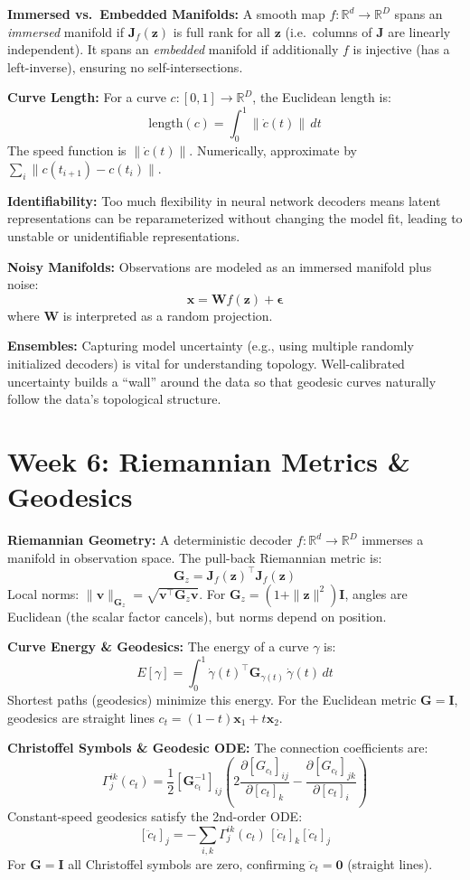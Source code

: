 \documentclass[12pt]{article}
\begin{document}
\textbf{Immersed vs.\ Embedded Manifolds:} A smooth map $f: \mathbb{R}^d \to \mathbb{R}^D$ spans an \emph{immersed} manifold if $\bm{J}_f(\bm{z})$ is full rank for all $\bm{z}$ (i.e.\ columns of $\bm{J}$ are linearly independent). It spans an \emph{embedded} manifold if additionally $f$ is injective (has a left-inverse), ensuring no self-intersections.

\textbf{Curve Length:} For a curve $c: [0,1] \to \mathbb{R}^D$, the Euclidean length is:
\[
\text{length}(c) = \int_0^1 \|\dot{c}(t)\|\, dt
\]
The speed function is $\|\dot{c}(t)\|$. Numerically, approximate by $\sum_{i} \|c(t_{i+1}) - c(t_i)\|$.

\textbf{Identifiability:} Too much flexibility in neural network decoders means latent representations can be reparameterized without changing the model fit, leading to unstable or unidentifiable representations.

\textbf{Noisy Manifolds:} Observations are modeled as an immersed manifold plus noise:
\[
\bm{x} = \bm{W}f(\bm{z}) + \bm{\epsilon}
\]
where $\bm{W}$ is interpreted as a random projection.

\textbf{Ensembles:} Capturing model uncertainty (e.g., using multiple randomly initialized decoders) is vital for understanding topology. Well-calibrated uncertainty builds a ``wall'' around the data so that geodesic curves naturally follow the data's topological structure.

\section*{Week 6: Riemannian Metrics \& Geodesics}

\textbf{Riemannian Geometry:} A deterministic decoder $f: \mathbb{R}^d \to \mathbb{R}^D$ immerses a manifold in observation space. The pull-back Riemannian metric is:
\[
\bm{G}_z = \bm{J}_f(\bm{z})^\top \bm{J}_f(\bm{z})
\]
Local norms: $\|\bm{v}\|_{\bm{G}_z} = \sqrt{\bm{v}^\top \bm{G}_z \bm{v}}$. For $\bm{G}_z = (1+\|\bm{z}\|^2)\bm{I}$, angles are Euclidean (the scalar factor cancels), but norms depend on position.

\textbf{Curve Energy \& Geodesics:} The energy of a curve $\gamma$ is:
\[
E[\gamma] = \int_0^1 \dot{\gamma}(t)^\top \bm{G}_{\gamma(t)}\, \dot{\gamma}(t)\, dt
\]
Shortest paths (geodesics) minimize this energy. For the Euclidean metric $\bm{G} = \bm{I}$, geodesics are straight lines $c_t = (1-t)\bm{x}_1 + t\bm{x}_2$.

\textbf{Christoffel Symbols \& Geodesic ODE:} The connection coefficients are:
\[
\Gamma_j^{ik}(c_t) = \frac{1}{2}[\bm{G}_{c_t}^{-1}]_{ij}\left(2\frac{\partial [G_{c_t}]_{ij}}{\partial [c_t]_k} - \frac{\partial [G_{c_t}]_{jk}}{\partial [c_t]_i}\right)
\]
Constant-speed geodesics satisfy the 2nd-order ODE:
\[
[\ddot{c}_t]_j = -\sum_{i,k} \Gamma_j^{ik}(c_t)\,[\dot{c}_t]_k[\dot{c}_t]_j
\]
For $\bm{G} = \bm{I}$ all Christoffel symbols are zero, confirming $\ddot{c}_t = \bm{0}$ (straight lines).
\end{document}
